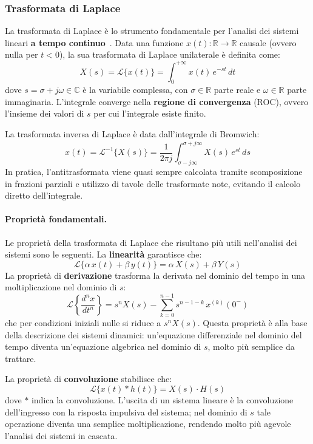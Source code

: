 \subsubsection{Trasformata di Laplace}
\label{trasform_laplace}
La trasformata di Laplace è lo strumento fondamentale per l'analisi dei sistemi lineari \textbf{a tempo continuo}~\cite{oppenheim1996signals}. Data una funzione $x(t) : \mathbb{R} \to \mathbb{R}$ causale (ovvero nulla per $t < 0$), la sua trasformata di Laplace unilaterale è definita come:
\[
X(s) = \mathcal{L}\{x(t)\} = \int_{0}^{+\infty} x(t)\, e^{-st}
\, dt
\]
dove $s = \sigma + j\omega \in \mathbb{C}$ è la variabile complessa, con $\sigma \in \mathbb{R}$ parte reale e $\omega \in \mathbb{R}$ parte immaginaria. L'integrale converge nella \textbf{regione di convergenza} (ROC), ovvero l'insieme dei valori di $s$ per cui l'integrale esiste finito.

La trasformata inversa di Laplace è data dall'integrale di Bromwich:
\[
x(t) = \mathcal{L}^{-1}\{X(s)\} = \frac{1}{2\pi j}
\int_{\sigma - j\infty}^{\sigma + j\infty} X(s)\, e^{st} \, ds
\]
In pratica, l'antitrasformata viene quasi sempre calcolata tramite scomposizione in frazioni parziali e utilizzo di tavole delle trasformate note, evitando il calcolo diretto dell'integrale.

\paragraph{Proprietà fondamentali.}
Le proprietà della trasformata di Laplace che risultano più utili nell'analisi dei sistemi sono le seguenti. La \textbf{linearità} garantisce che:
\[
\mathcal{L}\{\alpha\, x(t) + \beta\, y(t)\} =
\alpha\, X(s) + \beta\, Y(s)
\]
La proprietà di \textbf{derivazione} trasforma la derivata nel dominio del tempo in una moltiplicazione nel dominio di $s$:
\[
\mathcal{L}\left\{\frac{d^n x}{dt^n}\right\} = s^n X(s) -
\sum_{k=0}^{n-1} s^{n-1-k}\, x^{(k)}(0^-)
\]
che per condizioni iniziali nulle si riduce a $s^n X(s)$. Questa proprietà è alla base della descrizione dei sistemi dinamici: un'equazione differenziale nel dominio del tempo diventa un'equazione algebrica nel dominio di $s$, molto più semplice da trattare.

La proprietà di \textbf{convoluzione} stabilisce che:
\[
\mathcal{L}\{x(t) * h(t)\} = X(s) \cdot H(s)
\]
dove $*$ indica la convoluzione. L'uscita di un sistema lineare è la convoluzione dell'ingresso con la risposta impulsiva del sistema; nel dominio di $s$ tale operazione diventa una semplice moltiplicazione, rendendo molto più agevole l'analisi dei sistemi in cascata.

